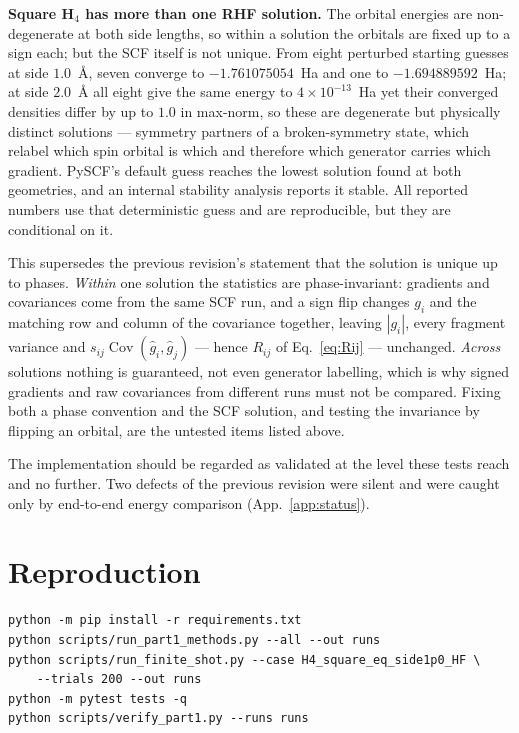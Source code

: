 \documentclass[10pt]{article}
\newcommand{\Cov}{\operatorname{Cov}}
\begin{document}
\textbf{Square H$_4$ has more than one RHF solution.} The orbital energies are
non-degenerate at both side lengths, so within a solution the orbitals are fixed
up to a sign each; but the SCF itself is not unique. From eight perturbed
starting guesses at side $1.0$~\si{\angstrom}, seven converge to
$-1.761075054$~Ha and one to $-1.694889592$~Ha; at side $2.0$~\si{\angstrom} all
eight give the same energy to $4\times10^{-13}$~Ha yet their converged densities
differ by up to $1.0$ in max-norm, so these are degenerate but physically
distinct solutions --- symmetry partners of a broken-symmetry state, which
relabel which spin orbital is which and therefore which generator carries which
gradient. PySCF's default guess reaches the lowest solution found at both
geometries, and an internal stability analysis reports it stable. All reported
numbers use that deterministic guess and are reproducible, but they are
conditional on it.

This supersedes the previous revision's statement that the solution is unique up
to phases. \emph{Within} one solution the statistics are phase-invariant:
gradients and covariances come from the same SCF run, and a sign flip changes
$g_i$ and the matching row and column of the covariance together, leaving
$|g_i|$, every fragment variance and $s_{ij}\Cov(\widehat g_i,\widehat g_j)$ ---
hence $R_{ij}$ of Eq.~\eqref{eq:Rij} --- unchanged. \emph{Across} solutions
nothing is guaranteed, not even generator labelling, which is why signed
gradients and raw covariances from different runs must not be compared. Fixing
both a phase convention and the SCF solution, and testing the invariance by
flipping an orbital, are the untested items listed above.

The implementation should be regarded as validated at the level these tests reach
and no further. Two defects of the previous revision were silent and were caught
only by end-to-end energy comparison (App.~\ref{app:status}).

\section{Reproduction}
\label{sec:reproduction}

\begin{verbatim}
python -m pip install -r requirements.txt
python scripts/run_part1_methods.py --all --out runs
python scripts/run_finite_shot.py --case H4_square_eq_side1p0_HF \
    --trials 200 --out runs
python -m pytest tests -q
python scripts/verify_part1.py --runs runs
\end{verbatim}
\end{document}
